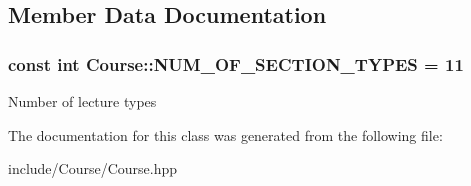 \subsection{Member Data Documentation}
\hypertarget{class_course_a3a9f1f09931aa53d4e7debf51f0cbcb1}{}
\subsubsection[{N\+U\+M\+\_\+\+O\+F\+\_\+\+S\+E\+C\+T\+I\+O\+N\+\_\+\+T\+Y\+P\+E\+S}]{\setlength{\rightskip}{0pt plus 5cm}const int Course\+::\+N\+U\+M\+\_\+\+O\+F\+\_\+\+S\+E\+C\+T\+I\+O\+N\+\_\+\+T\+Y\+P\+E\+S = 11\hspace{0.3cm}{\ttfamily [static]}}\label{class_course_a3a9f1f09931aa53d4e7debf51f0cbcb1}
Number of lecture types 

The documentation for this class was generated from the following file\+:\begin{DoxyCompactItemize}
\item 
include/\+Course/Course.\+hpp\end{DoxyCompactItemize}
